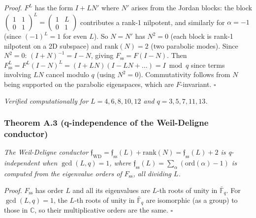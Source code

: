 \documentclass[
  11pt,
]{article}
\begin{document}
\emph{Proof.} \(F^L\) has the form \(I + LN'\) where \(N'\) arises from
the Jordan blocks: the block
\(\left(\begin{smallmatrix} 1 & 1 \\ 0 & 1 \end{smallmatrix}\right)^L = \left(\begin{smallmatrix} 1 & L \\ 0 & 1 \end{smallmatrix}\right)\)
contributes a rank-1 nilpotent, and similarly for \(\alpha = -1\) (since
\((-1)^L = 1\) for even \(L\)). So \(N = N'\) has \(N^2 = 0\) (each
block is rank-1 nilpotent on a 2D subspace) and \(\mathrm{rank}(N) = 2\)
(two parabolic modes). Since \(N^2 = 0\): \((I + N)^{-1} = I - N\),
giving \(F_{\mathrm{ss}} = F(I - N)\). Then
\(F_{\mathrm{ss}}^L = F^L (I - N)^L = (I + LN)(I - LN + \ldots) = I \bmod q\)
since terms involving \(LN\) cancel modulo \(q\) (using \(N^2 = 0\)).
Commutativity follows from \(N\) being supported on the parabolic
eigenspaces, which are \(F\)-invariant. \(\square\)

\emph{Verified computationally for \(L = 4, 6, 8, 10, 12\) and
\(q = 3, 5, 7, 11, 13\).}

\hypertarget{theorem-a.3-q-independence-of-the-weil-deligne-conductor}{%
\subsubsection{Theorem A.3 (q-independence of the Weil-Deligne
conductor)}\label{theorem-a.3-q-independence-of-the-weil-deligne-conductor}}

\emph{The Weil-Deligne conductor
\(\mathfrak{f}_{\mathrm{WD}} = \mathfrak{f}_{\mathrm{ss}}(L) + \mathrm{rank}(N) = \mathfrak{f}_{\mathrm{ss}}(L) + 2\)
is q-independent when \(\gcd(L, q) = 1\), where
\(\mathfrak{f}_{\mathrm{ss}}(L) = \sum_\alpha (\mathrm{ord}(\alpha) - 1)\)
is computed from the eigenvalue orders of \(F_{\mathrm{ss}}\), all
dividing \(L\).}

\emph{Proof.} \(F_{\mathrm{ss}}\) has order \(L\) and all its
eigenvalues are \(L\)-th roots of unity in \(\bar{\mathbb{F}}_q\). For
\(\gcd(L, q) = 1\), the \(L\)-th roots of unity in
\(\bar{\mathbb{F}}_q\) are isomorphic (as a group) to those in
\(\mathbb{C}\), so their multiplicative orders are the same. \(\square\)
\end{document}
